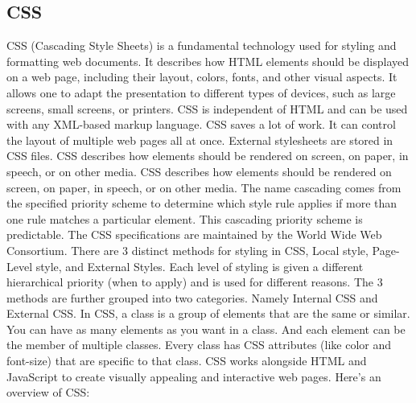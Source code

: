 \documentclass[12 pt, oneside]{book}
\begin{document}
\subsection{CSS}
CSS (Cascading Style Sheets) is a fundamental technology used for styling and formatting web documents. It describes how HTML elements should be displayed on a web page, including their layout, colors, fonts, and other visual aspects. It allows one to adapt the presentation to different types of devices, such as large screens, small screens, or printers. CSS is independent of HTML and can be used with any XML-based markup language. 
CSS saves a lot of work. It can control the layout of multiple web pages all at once. External stylesheets are stored in CSS files.
CSS describes how elements should be rendered on screen, on paper, in speech, or on other media. 
CSS describes how elements should be rendered on screen, on paper, in speech, or on other media.
\newline
The name cascading comes from the specified priority scheme to determine which style rule applies if more than one rule matches a particular element. This cascading priority scheme is predictable. The CSS specifications are maintained by the World Wide Web Consortium.
There are 3 distinct methods for styling in CSS, Local style, Page-Level style, and External Styles. Each level of styling is given a different hierarchical priority (when to apply) and is used for different reasons. The 3 methods are further grouped into two categories. Namely Internal CSS and External CSS.
In CSS, a class is a group of elements that are the same or similar. You can have as many elements as you want in a class. And each element can be the member of multiple classes. Every class has CSS attributes (like color and font-size) that are specific to that class.
CSS works alongside HTML and JavaScript to create visually appealing and interactive web pages. Here's an overview of CSS:
\end{document}
